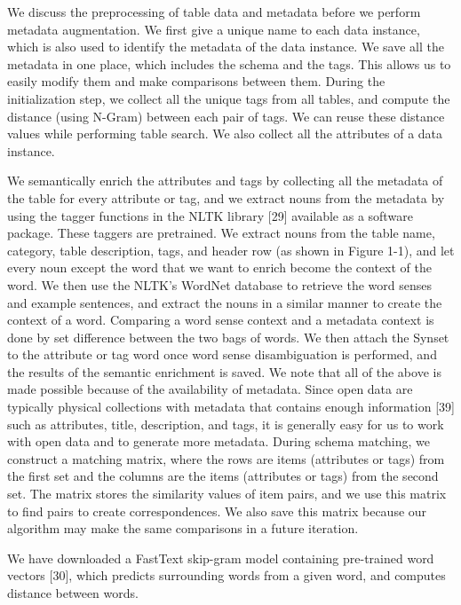 We discuss the preprocessing of table data and metadata before we perform metadata augmentation. We first give a unique name to each data instance, which is also used to identify the metadata of the data instance. We save all the metadata in one place, which includes the schema and the tags. This allows us to easily modify them and make comparisons between them. During the initialization step, we collect all the unique tags from all tables, and compute the distance (using N-Gram) between each pair of tags. We can reuse these distance values while performing table search. We also collect all the attributes of a data instance.

We semantically enrich the attributes and tags by collecting all the metadata of the table for every attribute or tag, and we extract nouns from the metadata by using the tagger functions in the NLTK library \cite{loper-bird-2002-nltk}[29] available as a software package. These taggers are pretrained. We extract nouns from the table name, category, table description, tags, and header row (as shown in Figure 1-1), and let every noun except the word that we want to enrich become the context of the word. We then use the NLTK's WordNet database to retrieve the word senses and example sentences, and extract the nouns in a similar manner to create the context of a word. Comparing a word sense context and a metadata context is done by set difference between the two bags of words. We then attach the Synset to the attribute or tag word once word sense disambiguation is performed, and the results of the semantic enrichment is saved.
We note that all of the above is made possible because of the availability of metadata. Since open data are typically physical collections with metadata that contains enough information \cite{Rahm2016Case}[39] such as attributes, title, description, and tags, it is generally easy for us to work with open data and to generate more metadata.
During schema matching, we construct a matching matrix, where the rows are items (attributes or tags) from the first set and the columns are the items (attributes or tags) from the second set. The matrix stores the similarity values of item pairs, and we use this matrix to find pairs to create correspondences. We also save this matrix because our algorithm may make the same comparisons in a future iteration.

We have downloaded a FastText skip-gram model containing pre-trained word vectors \cite{mikolov-etal-2018-advances}[30], which predicts surrounding words from a given word, and computes distance between words.

